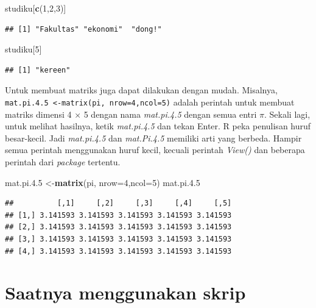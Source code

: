 \documentclass[a4paper, nobind]{templates/ociamthesis}
\newenvironment{Shaded}{\begin{snugshade}}{\end{snugshade}}
\newcommand{\AttributeTok}[1]{\textcolor[rgb]{0.13,0.29,0.53}{#1}}
\newcommand{\DecValTok}[1]{\textcolor[rgb]{0.00,0.00,0.81}{#1}}
\newcommand{\FloatTok}[1]{\textcolor[rgb]{0.00,0.00,0.81}{#1}}
\newcommand{\FunctionTok}[1]{\textcolor[rgb]{0.13,0.29,0.53}{\textbf{#1}}}
\newcommand{\NormalTok}[1]{#1}
\newcommand{\OtherTok}[1]{\textcolor[rgb]{0.56,0.35,0.01}{#1}}
\renewenvironment{Shaded}
{
  \vspace{10pt}%
  \begin{snugshade}%
}{%
  \end{snugshade}%
  \vspace{8pt}%
}
\begin{document}
\begin{Shaded}
\begin{Highlighting}[]
\NormalTok{studiku[}\FunctionTok{c}\NormalTok{(}\DecValTok{1}\NormalTok{,}\DecValTok{2}\NormalTok{,}\DecValTok{3}\NormalTok{)]}
\end{Highlighting}
\end{Shaded}

\begin{verbatim}
## [1] "Fakultas" "ekonomi"  "dong!"
\end{verbatim}

\begin{Shaded}
\begin{Highlighting}[]
\NormalTok{studiku[}\DecValTok{5}\NormalTok{]}
\end{Highlighting}
\end{Shaded}

\begin{verbatim}
## [1] "kereen"
\end{verbatim}

Untuk membuat matriks juga dapat dilakukan dengan mudah. Misalnya, \texttt{mat.pi.4.5\ \textless{}-matrix(pi,\ nrow=4,ncol=5)} adalah perintah untuk membuat matriks dimensi 4 × 5 dengan nama \emph{mat.pi.4.5} dengan semua entri \(\pi\). Sekali lagi, untuk melihat hasilnya, ketik \emph{mat.pi.4.5} dan tekan Enter. R peka penulisan huruf besar-kecil. Jadi \emph{mat.pi.4.5} dan \emph{mat.Pi.4.5} memiliki arti yang berbeda. Hampir semua perintah menggunakan huruf kecil, kecuali perintah \emph{View()} dan beberapa perintah dari \emph{package} tertentu.

\begin{Shaded}
\begin{Highlighting}[]
\NormalTok{mat.pi.}\FloatTok{4.5} \OtherTok{\textless{}{-}}\FunctionTok{matrix}\NormalTok{(pi, }\AttributeTok{nrow=}\DecValTok{4}\NormalTok{,}\AttributeTok{ncol=}\DecValTok{5}\NormalTok{)}
\NormalTok{mat.pi.}\FloatTok{4.5}
\end{Highlighting}
\end{Shaded}

\begin{verbatim}
##          [,1]     [,2]     [,3]     [,4]     [,5]
## [1,] 3.141593 3.141593 3.141593 3.141593 3.141593
## [2,] 3.141593 3.141593 3.141593 3.141593 3.141593
## [3,] 3.141593 3.141593 3.141593 3.141593 3.141593
## [4,] 3.141593 3.141593 3.141593 3.141593 3.141593
\end{verbatim}

\hypertarget{saatnya-menggunakan-skrip}{%
\section{Saatnya menggunakan skrip}\label{saatnya-menggunakan-skrip}}
\end{document}
